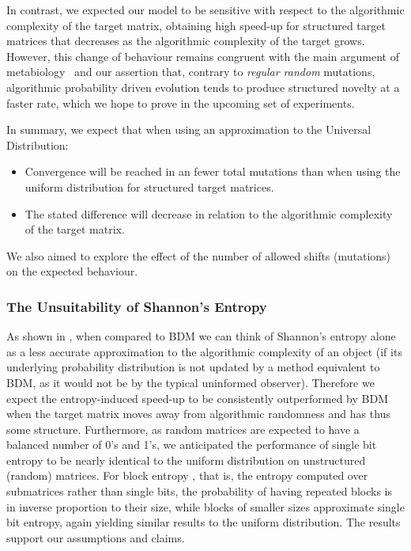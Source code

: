 \documentclass[10pt]{article}
\begin{document}
In contrast, we expected our model to be sensitive with respect to the algorithmic complexity of the target matrix, obtaining high speed-up for structured target matrices that decreases as the algorithmic complexity of the target grows. However, this change of behaviour remains congruent with the main argument of metabiology~\cite{ChaitinBook} and our assertion that, contrary to \textit{regular random} mutations, algorithmic probability driven evolution tends to produce structured novelty at a faster rate, which we hope to prove in the upcoming set of experiments.

In summary, we expect that when using an approximation to the Universal Distribution:

\begin{itemize}
    \item Convergence will be reached in an fewer total
    mutations than when using the uniform distribution for structured target matrices.
    \item The stated difference will decrease in relation to the algorithmic complexity of
    the target matrix.
\end{itemize}
\noindent{}We also aimed to explore the effect of the number of allowed shifts (mutations) on the expected behaviour.

\subsubsection{The Unsuitability of Shannon's Entropy}\label{the-case-against-shannons-entropy.}

As shown in \cite{zenil2017low,zenil2016decomposition}, when compared to BDM we can think of Shannon's entropy alone as a less accurate approximation to the algorithmic complexity of an object (if its underlying probability distribution is not updated by a method equivalent to BDM, as it would not be by the typical uninformed observer). Therefore we expect the entropy-induced speed-up to be consistently outperformed by BDM when the target matrix moves away from algorithmic randomness and has thus some structure. Furthermore, as random matrices are expected to have a balanced number of 0's and 1's, we anticipated the performance of single bit entropy to be nearly identical to the uniform distribution on unstructured (random) matrices. For block entropy \cite{Shannon-bell48,SCHMITT1997369}, that is, the entropy computed over submatrices rather than single bits, the probability of having repeated blocks is in inverse proportion to their size, while blocks of smaller sizes approximate single bit entropy, again yielding similar results to the uniform distribution. The results support our assumptions and claims.
\end{document}
